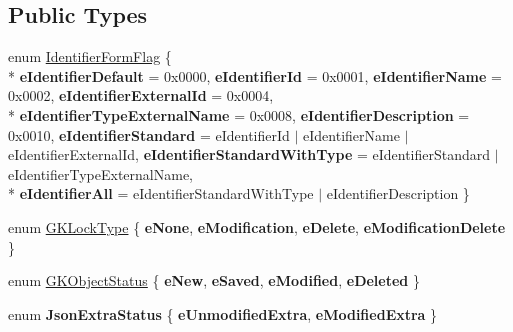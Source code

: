 \subsection*{Public Types}
\begin{DoxyCompactItemize}
\item 
enum \hyperlink{classGKObject_af9a418378f637f4666f50b720f9f41e4}{Identifier\+Form\+Flag} \{ \\*
{\bfseries e\+Identifier\+Default} = 0x0000, 
{\bfseries e\+Identifier\+Id} = 0x0001, 
{\bfseries e\+Identifier\+Name} = 0x0002, 
{\bfseries e\+Identifier\+External\+Id} = 0x0004, 
\\*
{\bfseries e\+Identifier\+Type\+External\+Name} = 0x0008, 
{\bfseries e\+Identifier\+Description} = 0x0010, 
{\bfseries e\+Identifier\+Standard} = e\+Identifier\+Id $\vert$ e\+Identifier\+Name $\vert$ e\+Identifier\+External\+Id, 
{\bfseries e\+Identifier\+Standard\+With\+Type} = e\+Identifier\+Standard $\vert$ e\+Identifier\+Type\+External\+Name, 
\\*
{\bfseries e\+Identifier\+All} = e\+Identifier\+Standard\+With\+Type $\vert$ e\+Identifier\+Description
 \}
\item 
enum \hyperlink{classGKObject_a097bd6e3a9c40a1b2d53cde7b171c851}{G\+K\+Lock\+Type} \{ {\bfseries e\+None}, 
{\bfseries e\+Modification}, 
{\bfseries e\+Delete}, 
{\bfseries e\+Modification\+Delete}
 \}
\item 
enum \hyperlink{classGKObject_ad8cb816946f2bd9e34714a830b14f3b8}{G\+K\+Object\+Status} \{ {\bfseries e\+New}, 
{\bfseries e\+Saved}, 
{\bfseries e\+Modified}, 
{\bfseries e\+Deleted}
 \}
\item 
enum {\bfseries Json\+Extra\+Status} \{ {\bfseries e\+Unmodified\+Extra}, 
{\bfseries e\+Modified\+Extra}
 \}\hypertarget{classGKObject_a7eb29d7fb8263e8b64b091566c500418}{}\label{classGKObject_a7eb29d7fb8263e8b64b091566c500418}

\end{DoxyCompactItemize}

